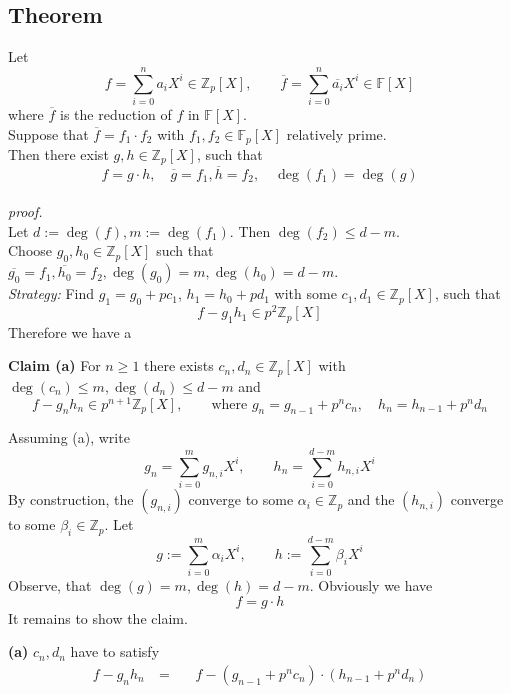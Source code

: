 \documentclass[12pt]{book}
\begin{document}
\begin{spacing}{1.3}
\subsection{Theorem } %
\titleformat{\subsection}{\normalfont\normalsize\bfseries}{}{0em}{#1 \thesubsection}
Let 
$$f= \sum_{i=0}^n a_i X^{i} \in \mathbb{Z}_p[X], \qquad \overline{f}=\sum_{i=0}^n \overline{a_i} X^{i} \in \mathbb{F}[X]$$
where $\overline{f}$ is the reduction of $f$ in $\mathbb{F}[X]$. \\
Suppose that $\overline{f}=f_1 \cdot f_2$ with $f_1, f_2 \in \mathbb{F}_p[X]$ relatively prime.\\
Then there exist $g,h \in \mathbb{Z}_p[X]$, such that 
$$f= g \cdot h, \quad \overline{g}=f_1, \overline{h}=f_2, \quad \deg(f_1)=\deg(g)$$
\pagebreak\\
\textit{proof.}\\
Let $d:= \deg(f), m:= \deg(f_1)$. Then $\deg(f_2) \leqslant d-m$.\\
Choose $g_0, h_0 \in \mathbb{Z}_p[X]$ such that $\overline{g_0}=f_1, \overline{h_0}=f_2, \deg(g_0)=m, \deg(h_0)=d-m$.\\
\textit{Strategy:} Find $g_1=g_0+pc_1$, $h_1=h_0+pd_1$ with some $c_1, d_1 \in \mathbb{Z}_p[X]$, such that 
$$f-g_1h_1 \in p^2 \mathbb{Z}_p[X]$$
Therefore we have a 
\begin{compactenum}
\item[\textbf{Claim (a)}] For $n \geqslant 1 $ there exists $c_n, d_n \in \mathbb{Z}_p[X]$ with $\deg(c_n) \leqslant m, \deg(d_n) \leqslant d-m$ and 
$$f-g_nh_n \in p^{n+1} \mathbb{Z}_p[X], \qquad \textrm{where } g_n= g_{n-1}+p^n c_n , \quad h_n=h_{n-1}+p^nd_n$$
\end{compactenum}
Assuming (a), write
$$g_n= \sum_{i=0}^m g_{n,i} X^{i}, \qquad h_n= \sum_{i=0}^{d-m} h_{n,i} X^{i}$$
By construction, the $(g_{n,i})$ converge to some $\alpha_i \in \mathbb{Z}_p$ and the $(h_{n,i})$ converge to some $\beta_i \in \mathbb{Z}_p$. Let 
$$g:=\sum_{i=0}^m \alpha_i X^{i}, \qquad h:=\sum_{i=0}^{d-m} \beta_i X^{i}$$
Observe, that $\deg(g)=m, \deg(h)=d-m$. Obviously we have $$f=g \cdot h$$
It remains to show the claim.
\begin{compactenum}
\item[\textbf{(a)}] $c_n, d_n$ have to satisfy
\begin{alignat*}{5}
f-g_nh_n \ &=&& \ f-\left(g_{n-1}+p^n c_n\right)\cdot \left(h_{n-1}+p^nd_n\right)\\

\end{alignat*}
\end{compactenum}
\end{spacing}
\end{document}
